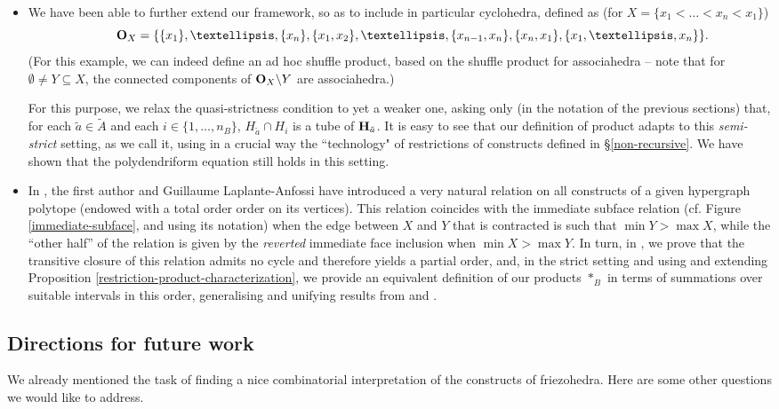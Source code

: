 \documentclass[11pt]{article}
\theoremstyle{definition}
\numberwithin{equation}{section}
\numberwithin{equation}{section}
\newcommand{\inc}{\subseteq}
\newcommand{\set}[1]{\{#1\}}
\newcommand{\hyper}[1]{{\bf #1}}
\begin{document}
\begin{itemize}
\item We have been able to further extend our framework, so as to include in particular cyclohedra, defined as (for $X=\set{x_1<\ldots<x_n<x_1}$)
$$\quad\quad{\bf O}_X=\set{\set{x_1},\ldots,\set{x_n},\set{x_1,x_2},\ldots,\set{x_{n-1},x_n},\set{x_n,x_1},\set{x_1,\ldots, x_n}}.$$  (For this example, we can indeed define an ad hoc  shuffle product, based on the shuffle product for associahedra -- note that for $\emptyset\neq Y\inc X$, the connected components of ${\bf O}_X\backslash Y$ are associahedra.) 

 For this purpose, we  relax the quasi-strictness condition to  yet a weaker one, asking only (in the notation of the previous sections) that, for each $\tilde a\in\tilde A$ and each $i\in\set{1,\ldots,n_B}$, $H_{\tilde a}\cap H_i$ is a tube of $\hyper{H}_{\tilde a}$. It is easy to see that our definition of product adapts to this  {\it semi-strict} setting, as we call it, using 
 in a crucial way the ``technology" of restrictions of constructs defined in  \S\ref{non-recursive}. We have shown  that the polydendriform equation still holds in this setting.
 
\item In \cite{CLA24}, the first author  and Guillaume Laplante-Anfossi have introduced a very natural relation on all constructs of a given hypergraph polytope (endowed with  a total order order on its vertices). This relation coincides with the immediate subface relation (cf. Figure \ref{immediate-subface}, and using its notation) when the  edge between $X$ and $Y$ that is contracted is such that $\min Y  > \max X$, while the ``other half'' of the relation is given by the {\em reverted} immediate face inclusion when $\min X  > \max Y$.
In turn, in  \cite{RSON}, we prove that the transitive closure of this relation admits no cycle and therefore yields a partial order, and, in the strict setting and using and extending Proposition \ref{restriction-product-characterization}, we provide an equivalent definition of our products $\ast_B$  in terms of  summations over suitable intervals in this order, generalising and unifying results from  \cite{PalaciosRonco} and \cite{RoncoGTO}.
\end{itemize}

\subsection*{Directions for future work}
 We already mentioned the task of  finding a nice combinatorial interpretation of the constructs of friezohedra. Here are some other questions we would like to address.
\end{document}
